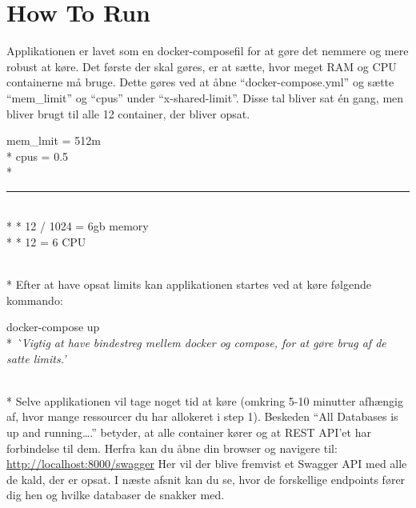 \section{How To Run}
Applikationen er lavet som en docker-composefil for at gøre det nemmere og mere robust at køre. Det første der skal gøres, er at sætte, hvor meget RAM og CPU containerne må bruge. Dette gøres ved at åbne “docker-compose.yml” og sætte “mem\_limit” og “cpus” under “x-shared-limit”. Disse tal bliver sat én gang, men bliver brugt til alle 12 container, der bliver opsat.
\begin{tcolorbox}
    \text mem\_lmit = 512m \\*
    \text cpus = 0.5 \\*
    \noindent\rule{5cm}{0.4pt} \\*
     * 12 / 1024 = 6gb memory \\*
     * 12 = 6 CPU
\end{tcolorbox}\leavevmode \\*
Efter at have opsat limits kan applikationen startes ved at køre følgende kommando:
\begin{tcolorbox}
    \text docker-compose up \\*
    \textit{^^ Vigtig at have bindestreg mellem docker og compose, for at gøre brug af de satte limits.'}
\end{tcolorbox}\leavevmode \\*
Selve applikationen vil tage noget tid at køre (omkring 5-10 minutter afhængig af, hvor mange ressourcer du har allokeret i step 1). Beskeden “All Databases is up and running….” betyder, at alle container kører og at REST API’et har forbindelse til dem. Herfra kan du åbne din browser og navigere til: \url{http://localhost:8000/swagger} Her vil der blive fremvist et Swagger API med alle de kald, der er opsat. I næste afsnit  kan du se, hvor de forskellige endpoints fører dig hen og hvilke databaser de snakker med.